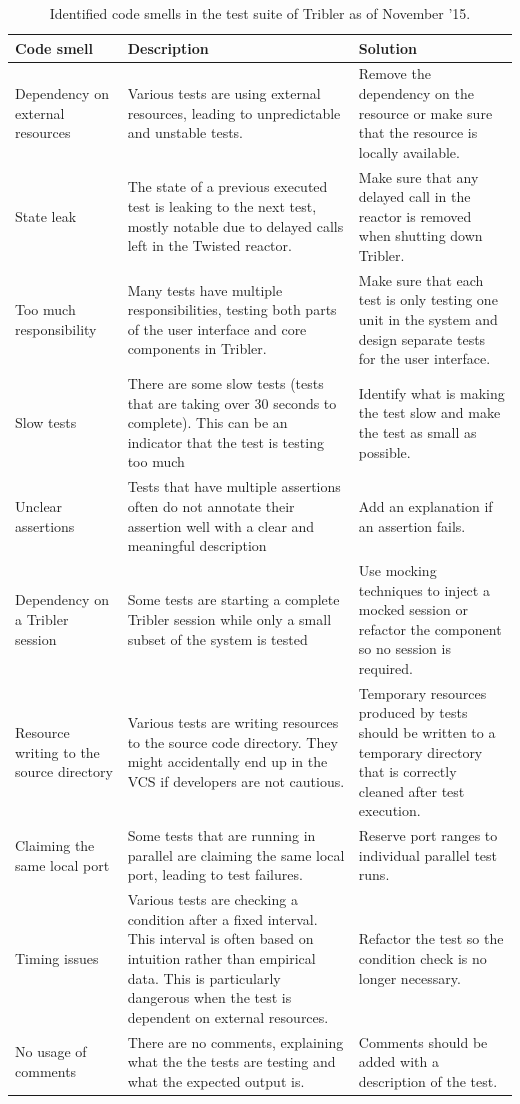 \begin{table}
	\begin{tabularx}{\textwidth}{|X|X|X|}
		\hline
		\textbf{Code smell} & \textbf{Description} & \textbf{Solution}\\ \hline
		Dependency on external resources & Various tests are using external resources, leading to unpredictable and unstable tests. & Remove the dependency on the resource or make sure that the resource is locally available. \\ \hline
		State leak & The state of a previous executed test is leaking to the next test, mostly notable due to delayed calls left in the Twisted reactor. & Make sure that any delayed call in the reactor is removed when shutting down Tribler. \\ \hline
		Too much responsibility & Many tests have multiple responsibilities, testing both parts of the user interface and core components in Tribler. & Make sure that each test is only testing one unit in the system and design separate tests for the user interface.\\ \hline
		Slow tests & There are some slow tests (tests that are taking over 30 seconds to complete). This can be an indicator that the test is testing too much & Identify what is making the test slow and make the test as small as possible. \\ \hline
		Unclear assertions & Tests that have multiple assertions often do not annotate their assertion well with a clear and meaningful description & Add an explanation if an assertion fails.\\ \hline
		Dependency on a Tribler session & Some tests are starting a complete Tribler session while only a small subset of the system is tested & Use mocking techniques to inject a mocked session or refactor the component so no session is required. \\ \hline
		Resource writing to the source directory & Various tests are writing resources to the source code directory. They might accidentally end up in the VCS if developers are not cautious. & Temporary resources produced by tests should be written to a temporary directory that is correctly cleaned after test execution. \\ \hline
		Claiming the same local port & Some tests that are running in parallel are claiming the same local port, leading to test failures. & Reserve port ranges to individual parallel test runs. \\ \hline
		Timing issues & Various tests are checking a condition after a fixed interval. This interval is often based on intuition rather than empirical data. This is particularly dangerous when the test is dependent on external resources. & Refactor the test so the condition check is no longer necessary.\\ \hline
		No usage of comments & There are no comments, explaining what the the tests are testing and what the expected output is. & Comments should be added with a description of the test. \\ \hline
	\end{tabularx}
	\caption{Identified code smells in the test suite of Tribler as of November '15.}
	\label{table:tests-code-smells}
\end{table}


